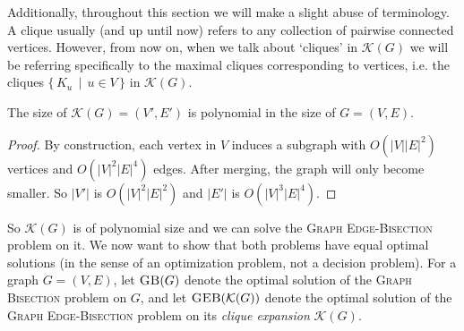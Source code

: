 \documentclass{article}
\newcommand{\gb}{\textsc{Graph \allowbreak Bisection} }
\newcommand{\geb}{\textsc{Graph \allowbreak Edge-\allowbreak Bisection} }
\newcommand{\sgeb}{\textsc{GEB} }
\newcommand{\sgb}{\textsc{GB} }
\begin{document}
	Additionally, throughout this section we will make a slight abuse of
	terminology. A clique usually (and up until now) refers to any collection
	of pairwise connected vertices. However, from now on, when we talk about
	`cliques' in $\mathcal{K}(G)$ we will be referring specifically to the
	maximal cliques corresponding to vertices, i.e. the cliques
	$\{\, K_u \,\mid\, u \in V \,\}$ in $\mathcal{K}(G)$.

	\begin{proposition}
		\label{poly-size}
		The size of $\mathcal{K}(G) = (V', E')$ is polynomial in the size of
		$G = (V, E)$.
	\end{proposition}
	\begin{proof}
		By construction, each vertex in $V$ induces a subgraph with
		$O(|V||E|^2)$
		vertices and $O(|V|^2|E|^4)$ edges. After merging, the graph will only
		become smaller. So $|V'|$ is $O(|V|^2 |E|^2)$ and $|E'|$ is
		$O(|V|^3|E|^4)$.
	\end{proof}

	So $\mathcal{K}(G)$ is of polynomial size and we can solve the \geb problem
	on it. We now want to show that both problems have equal optimal solutions
	(in the sense of an optimization problem, not a decision problem). For
	a graph $G=(V, E)$, let $\sgb(G)$ denote the optimal solution of the \gb
	problem on $G$, and let $\sgeb(\mathcal{K}(G))$ denote the optimal solution
	of the \geb problem on its \textit{clique expansion} $\mathcal{K}(G)$.
\end{document}
